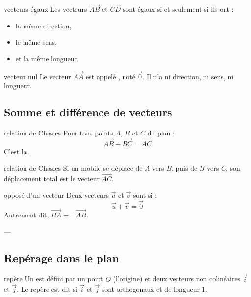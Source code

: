 \begin{exemple}{}{vecteurs égaux}
Les vecteurs $\overrightarrow{AB}$ et $\overrightarrow{CD}$ sont égaux si et seulement si ils ont :
\begin{itemize}
    \item la même direction,
    \item le même sens,
    \item et la même longueur.
\end{itemize}
\end{exemple}

\begin{remarque}{}{vecteur nul}
Le vecteur $\overrightarrow{AA}$ est appelé , noté $\overrightarrow{0}$.  
Il n’a ni direction, ni sens, ni longueur.
\end{remarque}


\subsection{Somme et différence de vecteurs}

\begin{proposition}{}{relation de Chasles}
Pour tous points $A$, $B$ et $C$ du plan :
\[
\overrightarrow{AB} + \overrightarrow{BC} = \overrightarrow{AC}
\]
C’est la .
\end{proposition}

\begin{exemple}{}{relation de Chasles}
Si un mobile se déplace de $A$ vers $B$, puis de $B$ vers $C$, son déplacement total est le vecteur $\overrightarrow{AC}$.
\end{exemple}

\begin{proposition}{}{opposé d'un vecteur}
Deux vecteurs $\overrightarrow{u}$ et $\overrightarrow{v}$ sont  si :
\[
\overrightarrow{u} + \overrightarrow{v} = \overrightarrow{0}
\]
Autrement dit, $\overrightarrow{BA} = -\overrightarrow{AB}$.
\end{proposition}

---

\subsection{Repérage dans le plan}

\begin{definition}{}{repère}
Un  est défini par un point $O$ (l’origine) et deux vecteurs non colinéaires $\vec{i}$ et $\vec{j}$.  
Le repère est dit  si $\vec{i}$ et $\vec{j}$ sont orthogonaux et de longueur $1$.
\end{definition}


